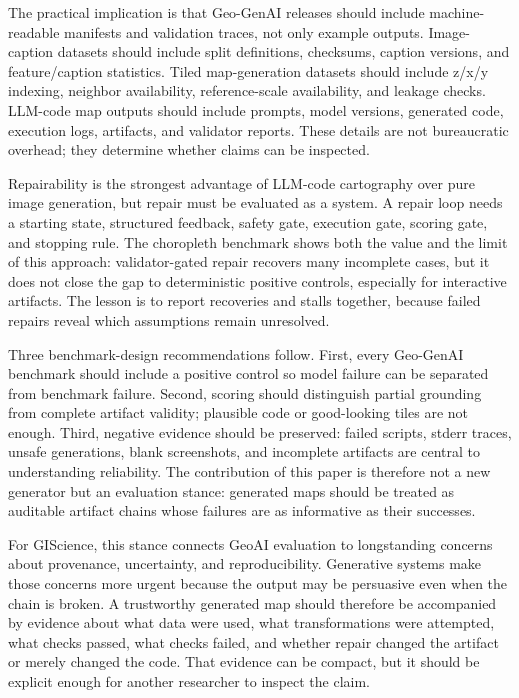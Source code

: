 \documentclass[]{interact}
\begin{document}
The practical implication is that Geo-GenAI releases should include machine-readable manifests and validation traces, not only example outputs. Image-caption datasets should include split definitions, checksums, caption versions, and feature/caption statistics. Tiled map-generation datasets should include z/x/y indexing, neighbor availability, reference-scale availability, and leakage checks. LLM-code map outputs should include prompts, model versions, generated code, execution logs, artifacts, and validator reports. These details are not bureaucratic overhead; they determine whether claims can be inspected.

Repairability is the strongest advantage of LLM-code cartography over pure image generation, but repair must be evaluated as a system. A repair loop needs a starting state, structured feedback, safety gate, execution gate, scoring gate, and stopping rule. The choropleth benchmark shows both the value and the limit of this approach: validator-gated repair recovers many incomplete cases, but it does not close the gap to deterministic positive controls, especially for interactive artifacts. The lesson is to report recoveries and stalls together, because failed repairs reveal which assumptions remain unresolved.

Three benchmark-design recommendations follow. First, every Geo-GenAI benchmark should include a positive control so model failure can be separated from benchmark failure. Second, scoring should distinguish partial grounding from complete artifact validity; plausible code or good-looking tiles are not enough. Third, negative evidence should be preserved: failed scripts, stderr traces, unsafe generations, blank screenshots, and incomplete artifacts are central to understanding reliability. The contribution of this paper is therefore not a new generator but an evaluation stance: generated maps should be treated as auditable artifact chains whose failures are as informative as their successes.

For GIScience, this stance connects GeoAI evaluation to longstanding concerns about provenance, uncertainty, and reproducibility. Generative systems make those concerns more urgent because the output may be persuasive even when the chain is broken. A trustworthy generated map should therefore be accompanied by evidence about what data were used, what transformations were attempted, what checks passed, what checks failed, and whether repair changed the artifact or merely changed the code. That evidence can be compact, but it should be explicit enough for another researcher to inspect the claim.
\end{document}
